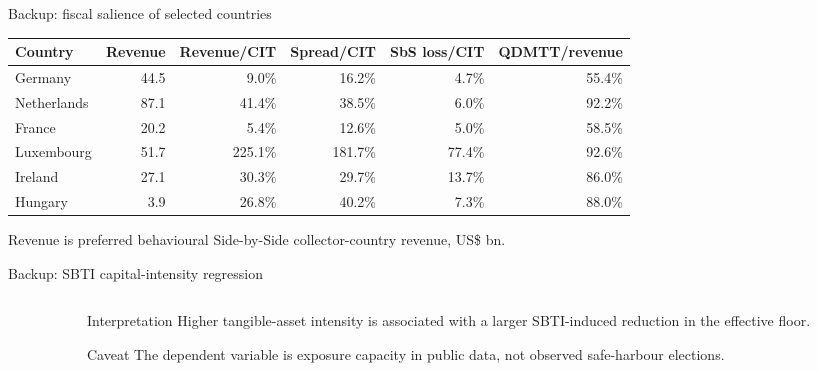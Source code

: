 \documentclass[aspectratio=169, 11pt]{beamer}
\newcommand{\sourceline}[1]{}
\begin{document}
\begin{frame}{Backup: fiscal salience of selected countries}
\small
\begin{center}
\scriptsize
\begin{tabular}{@{}lrrrrr@{}}
  \toprule
  Country & Revenue & Revenue/CIT & Spread/CIT & SbS loss/CIT & QDMTT/revenue \\
  \midrule
  Germany & 44.5 & 9.0\% & 16.2\% & 4.7\% & 55.4\% \\
  Netherlands & 87.1 & 41.4\% & 38.5\% & 6.0\% & 92.2\% \\
  France & 20.2 & 5.4\% & 12.6\% & 5.0\% & 58.5\% \\
  Luxembourg & 51.7 & 225.1\% & 181.7\% & 77.4\% & 92.6\% \\
  Ireland & 27.1 & 30.3\% & 29.7\% & 13.7\% & 86.0\% \\
  Hungary & 3.9 & 26.8\% & 40.2\% & 7.3\% & 88.0\% \\
  \bottomrule
\end{tabular}
\end{center}
\tiny Revenue is preferred behavioural Side-by-Side collector-country revenue, US\$ bn.
\sourceline{generated Table country\_fiscal\_salience}
\end{frame}

\begin{frame}{Backup: SBTI capital-intensity regression}
\small
\begin{columns}[T]
\begin{column}{0.48\textwidth}
\begin{center}
\scriptsize
{}
\end{center}
\end{column}
\begin{column}{0.48\textwidth}
\begin{block}{Interpretation}
  Higher tangible-asset intensity is associated with a larger SBTI-induced reduction in the effective floor.
\end{block}
\begin{alertblock}{Caveat}
  The dependent variable is exposure capacity in public data, not observed safe-harbour elections.
\end{alertblock}
\end{column}
\end{columns}
\sourceline{generated Table stage2\_h5\_regression}
\end{frame}
\end{document}
